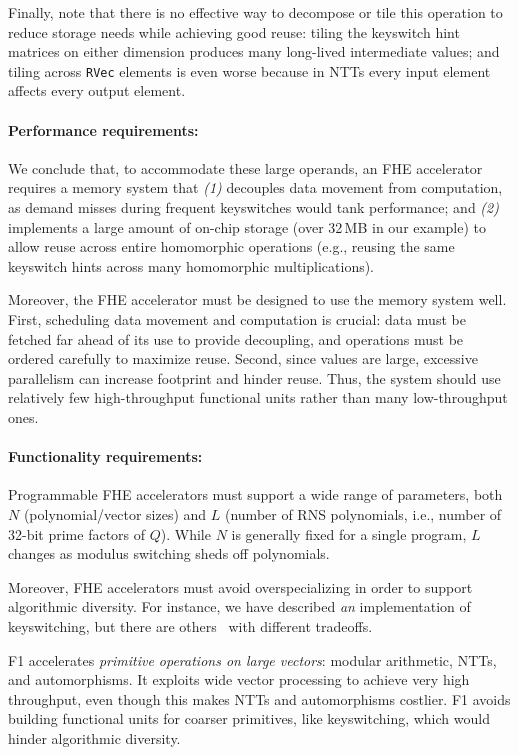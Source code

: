 Finally, note that there is no effective way to decompose or tile this
operation to reduce storage needs while achieving good reuse: tiling the
keyswitch hint matrices on either dimension produces many long-lived
intermediate values; and tiling across \texttt{RVec} elements is even worse
because in NTTs every input element affects every output element.

\paragraph{Performance requirements:} We conclude that, to accommodate these
large operands, an FHE accelerator requires a memory system that \emph{(1)}
decouples data movement from computation, as demand misses during frequent
keyswitches would tank performance; and \emph{(2)} implements a large amount of
on-chip storage (over 32\,MB in our example) to allow reuse across entire
homomorphic operations (e.g., reusing the same keyswitch hints across many
homomorphic multiplications).

Moreover, the FHE accelerator must be designed to use the memory system well.
First, scheduling data movement and computation is crucial: data must be
fetched far ahead of its use to provide decoupling, and operations must be
ordered carefully to maximize reuse. Second, since values are large, excessive
parallelism can increase footprint and hinder reuse. Thus, the system should
use relatively few high-throughput functional units rather than many
low-throughput ones.

\paragraph{Functionality requirements:}
Programmable FHE accelerators must support a wide range of parameters, both $N$
(polynomial/vector sizes) and $L$ (number of RNS polynomials, i.e., number of
32-bit prime factors of $Q$). While $N$ is generally fixed for a single
program, $L$ changes as modulus switching sheds off polynomials.

Moreover, FHE accelerators must avoid overspecializing in order to support
algorithmic diversity. For instance, we have described \emph{an} implementation
of keyswitching, but there are
others~\cite{kim:jmir18:helr,gentry:crypto2012:homomorphic} with different
tradeoffs.

F1 accelerates \emph{primitive operations on large vectors}: modular
arithmetic, NTTs, and automorphisms. It exploits wide vector processing to
achieve very high throughput, even though this makes NTTs and automorphisms
costlier. F1 avoids building functional units for coarser primitives, like
keyswitching, which would hinder algorithmic diversity.

